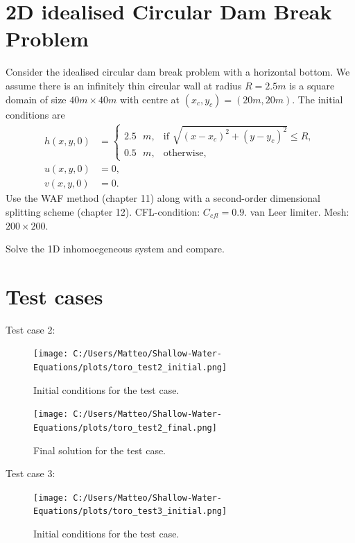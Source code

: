 \section{2D idealised Circular Dam Break Problem}
Consider the idealised circular dam break problem with a horizontal bottom.
We assume there is an infinitely thin circular wall at radius $R = 2.5 m$ is a square domain of size $40 m \times 40 m$ with centre at $(x_c,y_c) = (20 m, 20 m)$.
The initial conditions are
\begin{align*}
    h(x,y,0) &= \begin{cases}
        2.5 \text{ }m, & \text{if } \sqrt{ {(x-x_c)}^2 + {(y-y_c)}^2 } \leq R, \\
        0.5 \text{ }m, & \text{otherwise},
    \end{cases} \\
    u(x,y,0) &= 0, \\
    v(x,y,0) &= 0.
\end{align*}
Use the WAF method (chapter 11) along with a second-order dimensional splitting scheme (chapter 12).
CFL-condition: $C_{cfl} = 0.9$.
van Leer limiter. Mesh: $200 \times 200$.

Solve the 1D inhomoegeneous system and compare.


\section{Test cases}

Test case 2: 


\begin{figure}[H]
    \centering
    \texttt{[image: C:/Users/Matteo/Shallow-Water-Equations/plots/toro\_test2\_initial.png]}
    \caption{Initial conditions for the test case.}\label{fig:toro_test2_initial}
\end{figure}

\begin{figure}[H]
    \centering
    \texttt{[image: C:/Users/Matteo/Shallow-Water-Equations/plots/toro\_test2\_final.png]}
    \caption{Final solution for the test case.}\label{fig:toro_test2_final}
\end{figure}


Test case 3:

\begin{figure}[H]
    \centering
    \texttt{[image: C:/Users/Matteo/Shallow-Water-Equations/plots/toro\_test3\_initial.png]}
    \caption{Initial conditions for the test case.}\label{fig:toro_test3_initial}
\end{figure}

